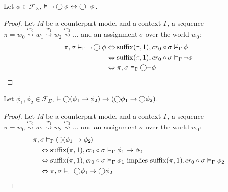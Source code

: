 \begin{lemma}\label{lem:negnextdist}
  Let $\phi \in \mathcal{F}_\Sigma$, $\vDash \neg\bigcirc{\phi} \leftrightarrow \bigcirc{\neg\phi}$.
\end{lemma}
\begin{proof}
  Let $M$ be a counterpart model and a context $\Gamma$, a sequence $\pi = w_0 \overset{cr_0}{\rightsquigarrow} w_1
  \overset{cr_1}{\rightsquigarrow} w_2 \overset{cr_2}{\rightsquigarrow} \ldots$ and an assignment $\sigma$ over the world $w_0$:
  \[
    \begin{split}
      {\pi}, {\sigma} \vDash_{\Gamma} {\neg\bigcirc{\phi}}
        &\Leftrightarrow {\operatorname{suffix}(\pi,1)}, {cr_0 \circ \sigma} \nvDash_{\Gamma} {\phi} \\
        &\Leftrightarrow {\operatorname{suffix}(\pi,1)}, {cr_0 \circ \sigma} \vDash_{\Gamma} {\neg\phi} \\
        &\Leftrightarrow {\pi}, {\sigma} \vDash_{\Gamma} {\bigcirc{\neg\phi}}
    \end{split}
  \]
\end{proof}

\begin{lemma}\label{lem:impnextdist}
  Let $\phi_1, \phi_2 \in \mathcal{F}_\Sigma$, $\vDash \bigcirc{(\phi_1 \to \phi_2)} \to (\bigcirc{\phi_1} \to
  \bigcirc{\phi_2})$.
\end{lemma}
\begin{proof}
  Let $M$ be a counterpart model and a context $\Gamma$, a sequence $\pi = w_0 \overset{cr_0}{\rightsquigarrow} w_1
  \overset{cr_1}{\rightsquigarrow} w_2 \overset{cr_2}{\rightsquigarrow} \ldots$ and an assignment $\sigma$ over the world $w_0$:
  \[
    \begin{split}
      &{\pi}, {\sigma} \vDash_{\Gamma} {\bigcirc{(\phi_1 \to \phi_2)}} \\
        &\quad\Leftrightarrow {\operatorname{suffix}(\pi,1)}, {cr_0 \circ \sigma} \vDash_{\Gamma} {\phi_1 \to \phi_2} \\
        &\quad\Leftrightarrow {\operatorname{suffix}(\pi,1)}, {cr_0 \circ \sigma} \vDash_{\Gamma} {\phi_1} \text{ implies }
            {\operatorname{suffix}(\pi,1)}, {cr_0 \circ \sigma} \vDash_{\Gamma} {\phi_2} \\
        &\quad\Leftrightarrow {\pi}, {\sigma} \vDash_{\Gamma} {\bigcirc{\phi_1} \to \bigcirc{\phi_2}}
    \end{split}
  \]
\end{proof}

